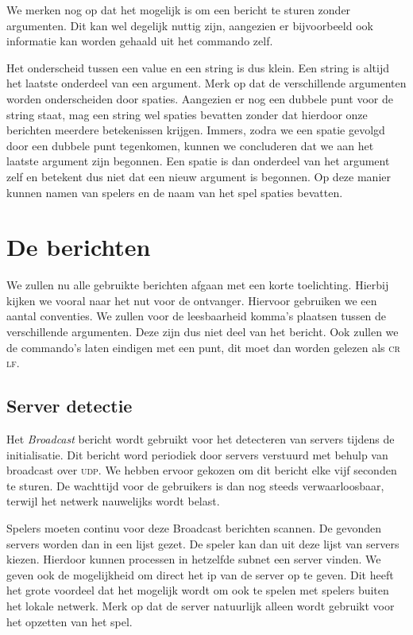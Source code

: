 \documentclass[a4paper,11pt, twoside]{article}
\newcommand{\udp}{\textsc{udp}\xspace}
\begin{document}
    We merken nog op dat het mogelijk is om een bericht te sturen zonder argumenten. Dit kan wel degelijk nuttig zijn, aangezien er bijvoorbeeld ook informatie kan worden gehaald uit het commando zelf.

    Het onderscheid tussen een value en een string is dus klein. Een string is altijd het laatste onderdeel van een argument. Merk op dat de verschillende argumenten worden onderscheiden door spaties. Aangezien er nog een dubbele punt voor de string staat, mag een string wel spaties bevatten zonder dat hierdoor onze berichten meerdere betekenissen krijgen. Immers, zodra we een spatie gevolgd door een dubbele punt tegenkomen, kunnen we concluderen dat we aan het laatste argument zijn begonnen. Een spatie is dan onderdeel van het argument zelf en betekent dus niet dat een nieuw argument is begonnen. Op deze manier kunnen namen van spelers en de naam van het spel spaties bevatten.

    \section{De berichten}
    We zullen nu alle gebruikte berichten afgaan met een korte toelichting. Hierbij kijken we vooral naar het nut voor de ontvanger. Hiervoor gebruiken we een aantal conventies. We zullen voor de leesbaarheid komma's plaatsen tussen de verschillende argumenten. Deze zijn dus niet deel van het bericht. Ook zullen we de commando's laten eindigen met een punt, dit moet dan worden gelezen als \textsc{cr lf}.

    \subsection{Server detectie}
    Het \emph{Broadcast} bericht wordt gebruikt voor het detecteren van servers tijdens de initialisatie. Dit bericht word periodiek door servers verstuurd met behulp van broadcast over \udp. We hebben ervoor gekozen om dit bericht elke vijf seconden te sturen. De wachttijd voor de gebruikers is dan nog steeds verwaarloosbaar, terwijl het netwerk nauwelijks wordt belast.

    Spelers moeten continu voor deze Broadcast berichten scannen. De gevonden servers worden dan in een lijst gezet. De speler kan dan uit deze lijst van servers kiezen. Hierdoor kunnen processen in hetzelfde subnet een server vinden. We geven ook de mogelijkheid om direct het ip van de server op te geven. Dit heeft het grote voordeel dat het mogelijk wordt om ook te spelen met spelers buiten het lokale netwerk. Merk op dat de server natuurlijk alleen wordt gebruikt voor het opzetten van het spel.
\end{document}
